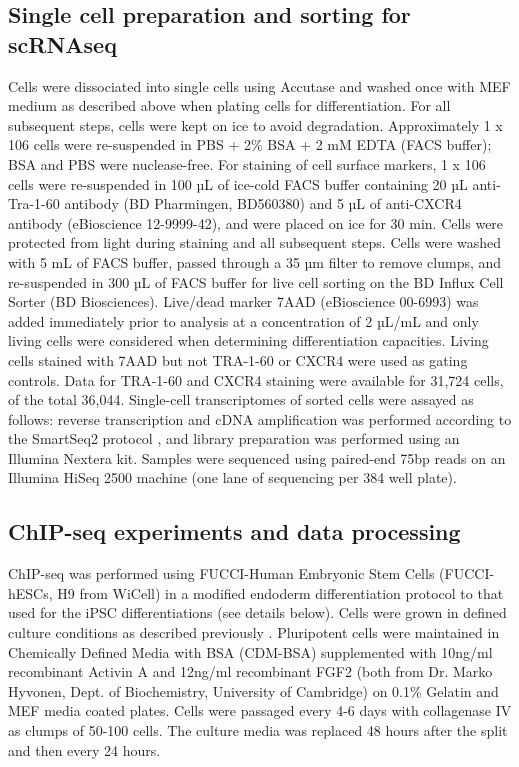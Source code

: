 \subsection{Single cell preparation and sorting for scRNAseq}
Cells were dissociated into single cells using Accutase and washed once with MEF medium as described above when plating cells for differentiation. 
For all subsequent steps, cells were kept on ice to avoid degradation.  Approximately 1 x 106 cells were re-suspended in PBS + 2\% BSA + 2 mM EDTA (FACS buffer); BSA and PBS were nuclease-free. 
For staining of cell surface markers, 1 x 106 cells were re-suspended in 100 µL of ice-cold FACS buffer containing 20 µL anti-Tra-1-60 antibody (BD Pharmingen, BD560380)  and 5 µL of anti-CXCR4 antibody (eBioscience 12-9999-42), and were placed on ice for 30 min. 
Cells were protected from light during staining and all subsequent steps. 
Cells were washed with 5 mL of FACS buffer, passed through a 35 µm filter to remove clumps, and re-suspended in 300 µL of FACS buffer for live cell sorting on the BD Influx Cell Sorter (BD Biosciences).
Live/dead marker 7AAD (eBioscience 00-6993) was added immediately prior to analysis at a concentration of 2 µL/mL and only living cells were considered when determining differentiation capacities. 
Living cells stained with 7AAD but not TRA-1-60 or CXCR4 were used as gating controls. Data for TRA-1-60 and CXCR4 staining were available for 31,724 cells, of the total 36,044. 
Single-cell transcriptomes of sorted cells were assayed as follows: reverse transcription and cDNA amplification was performed according to the SmartSeq2 protocol \cite{picelli2013smart}, and library preparation was performed using an Illumina Nextera kit. 
Samples were sequenced using paired-end 75bp reads on an Illumina HiSeq 2500 machine (one lane of sequencing per 384 well plate).

\subsection{ChIP-seq experiments and data processing}
\label{sec:endodiff_chipseq}

ChIP-seq was performed using FUCCI-Human Embryonic Stem Cells (FUCCI-hESCs, H9 from WiCell) in a modified endoderm differentiation protocol to that used for the iPSC differentiations (see details below). 
Cells were grown in defined culture conditions as described previously \cite{brons2007derivation}. 
Pluripotent cells were maintained in Chemically Defined Media with BSA (CDM-BSA) supplemented with 10ng/ml recombinant Activin A and 12ng/ml recombinant FGF2 (both from Dr. Marko Hyvonen, Dept. of Biochemistry, University of Cambridge) on 0.1\% Gelatin and MEF media coated plates. 
Cells were passaged every 4-6 days with collagenase IV as clumps of 50-100 cells. 
The culture media was replaced 48 hours after the split and then every 24 hours. \\

